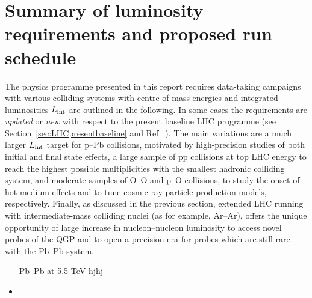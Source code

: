 \documentclass[../report.tex]{subfiles}
\begin{document}
\section{Summary of luminosity requirements and proposed run schedule}
\label{sec:schedule}

The physics programme presented in this report requires data-taking campaigns with various colliding systems with centre-of-mass energies and integrated luminosities $L_{\rm int}$ are outlined in the following. In some cases the requirements are {\it updated} or {\it new} with respect to the present baseline LHC programme (see Section~\ref{sec:LHCpresentbaseline} and Ref.~\cite{Abelevetal:2014cna}). The main variations are a much larger $L_{\rm int}$ target for p--Pb collisions, motivated by high-precision studies of both initial and final state effects, a large sample of pp collisions at top LHC energy to reach the highest possible multiplicities with the smallest hadronic colliding system, and moderate samples of O--O and p--O collisions, to study the onset of hot-medium effects and to tune cosmic-ray particle production models, respectively. Finally, as discussed in the previous section, extended LHC running with intermediate-mass colliding nuclei (as for example, Ar--Ar), offers the unique opportunity of large increase in nucleon--nucleon luminosity to access novel probes of the QGP and to open a precision era for probes which are still rare with the Pb--Pb system.   

\begin{itemize}
\item[Pb--Pb at 5.5 TeV] hjhj 

\item 

\end{itemize}
\end{document}
